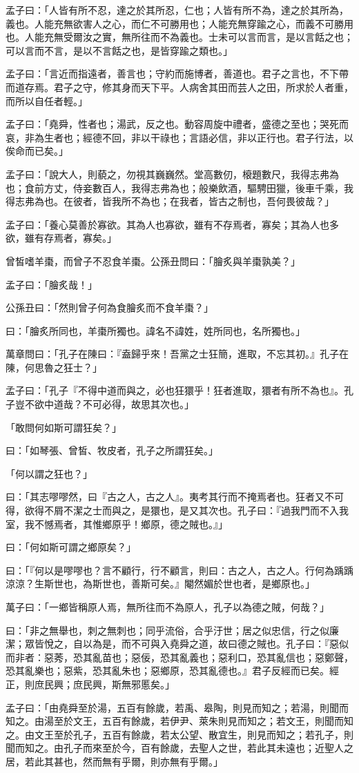\begin{pinyinscope}
孟子曰：「人皆有所不忍，達之於其所忍，仁也；人皆有所不為，達之於其所為，義也。人能充無欲害人之心，而仁不可勝用也；人能充無穿踰之心，而義不可勝用也。人能充無受爾汝之實，無所往而不為義也。士未可以言而言，是以言餂之也；可以言而不言，是以不言餂之也，是皆穿踰之類也。」

孟子曰：「言近而指遠者，善言也；守約而施博者，善道也。君子之言也，不下帶而道存焉。君子之守，修其身而天下平。人病舍其田而芸人之田，所求於人者重，而所以自任者輕。」

孟子曰：「堯舜，性者也；湯武，反之也。動容周旋中禮者，盛德之至也；哭死而哀，非為生者也；經德不回，非以干祿也；言語必信，非以正行也。君子行法，以俟命而已矣。」

孟子曰：「說大人，則藐之，勿視其巍巍然。堂高數仞，榱題數尺，我得志弗為也；食前方丈，侍妾數百人，我得志弗為也；般樂飲酒，驅騁田獵，後車千乘，我得志弗為也。在彼者，皆我所不為也；在我者，皆古之制也，吾何畏彼哉？」

孟子曰：「養心莫善於寡欲。其為人也寡欲，雖有不存焉者，寡矣；其為人也多欲，雖有存焉者，寡矣。」

曾皙嗜羊棗，而曾子不忍食羊棗。公孫丑問曰：「膾炙與羊棗孰美？」

孟子曰：「膾炙哉！」

公孫丑曰：「然則曾子何為食膾炙而不食羊棗？」

曰：「膾炙所同也，羊棗所獨也。諱名不諱姓，姓所同也，名所獨也。」

萬章問曰：「孔子在陳曰：『盍歸乎來！吾黨之士狂簡，進取，不忘其初。』孔子在陳，何思魯之狂士？」

孟子曰：「孔子『不得中道而與之，必也狂獧乎！狂者進取，獧者有所不為也』。孔子豈不欲中道哉？不可必得，故思其次也。」

「敢問何如斯可謂狂矣？」

曰：「如琴張、曾皙、牧皮者，孔子之所謂狂矣。」

「何以謂之狂也？」

曰：「其志嘐嘐然，曰『古之人，古之人』。夷考其行而不掩焉者也。狂者又不可得，欲得不屑不潔之士而與之，是獧也，是又其次也。孔子曰：『過我門而不入我室，我不憾焉者，其惟鄉原乎！鄉原，德之賊也。』」

曰：「何如斯可謂之鄉原矣？」

曰：「『何以是嘐嘐也？言不顧行，行不顧言，則曰：古之人，古之人。行何為踽踽涼涼？生斯世也，為斯世也，善斯可矣。』閹然媚於世也者，是鄉原也。」

萬子曰：「一鄉皆稱原人焉，無所往而不為原人，孔子以為德之賊，何哉？」

曰：「非之無舉也，刺之無刺也；同乎流俗，合乎汙世；居之似忠信，行之似廉潔；眾皆悅之，自以為是，而不可與入堯舜之道，故曰德之賊也。孔子曰：『惡似而非者：惡莠，恐其亂苗也；惡佞，恐其亂義也；惡利口，恐其亂信也；惡鄭聲，恐其亂樂也；惡紫，恐其亂朱也；惡鄉原，恐其亂德也。』君子反經而已矣。經正，則庶民興；庶民興，斯無邪慝矣。」

孟子曰：「由堯舜至於湯，五百有餘歲，若禹、皋陶，則見而知之；若湯，則聞而知之。由湯至於文王，五百有餘歲，若伊尹、萊朱則見而知之；若文王，則聞而知之。由文王至於孔子，五百有餘歲，若太公望、散宜生，則見而知之；若孔子，則聞而知之。由孔子而來至於今，百有餘歲，去聖人之世，若此其未遠也；近聖人之居，若此其甚也，然而無有乎爾，則亦無有乎爾。」


\end{pinyinscope}